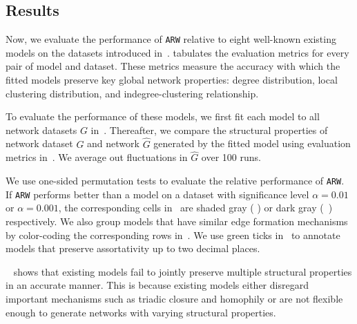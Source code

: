 \vspace{-11pt}
\subsection{Results}
\label{sub:Experimental Results}

Now, we evaluate the performance of \texttt{ARW} relative to eight well-known
existing models on the datasets introduced in~.
 tabulates the evaluation metrics for every pair of model
and dataset. These metrics measure the accuracy with which the fitted models
preserve key global network properties: degree distribution, local clustering distribution,
and indegree-clustering relationship.

To evaluate the performance of these models, we first fit each model
to all network datasets $G$ in~.
Thereafter, we compare the structural properties of network dataset $G$ and network $\hat{G}$
generated by the fitted model using evaluation metrics in~. We average out
fluctuations in $\hat{G}$ over 100 runs.

We use one-sided permutation tests \cite{good2013permutation} to evaluate the relative
performance of \texttt{ARW}. If \texttt{ARW} performs better than a model on a dataset
with significance level $\alpha=0.01$ or $\alpha=0.001$, the corresponding cells in~
are shaded gray ( \lightgraybg{ }) or dark gray (~\darkgraybg{ }) respectively.
We also group models that have similar edge formation mechanisms by color-coding the
corresponding rows in~.  We use green ticks in~ to
annotate models that preserve assortativity up to two decimal places.


~ shows that existing models fail to jointly preserve
{multiple} structural properties in an accurate manner. This is because existing
models either disregard important mechanisms such as triadic closure and homophily
or are not flexible enough to generate networks with varying structural properties.

